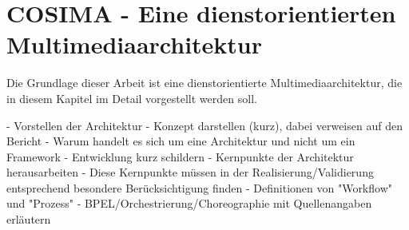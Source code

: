 
\chapter{COSIMA - Eine dienstorientierten Multimediaarchitektur} %
\label{cha:eine_dienstorientierten_multimediaarchitektur}

  Die Grundlage dieser Arbeit ist eine dienstorientierte Multimediaarchitektur, die in diesem Kapitel im Detail vorgestellt werden soll. 

- Vorstellen der Architektur
- Konzept darstellen (kurz), dabei verweisen auf den Bericht
- Warum handelt es sich um eine Architektur und nicht um ein Framework
- Entwicklung kurz schildern
- Kernpunkte der Architektur herausarbeiten
- Diese Kernpunkte müssen in der Realisierung/Validierung entsprechend besondere Berücksichtigung finden
- Definitionen von "Workflow" und "Prozess"
- BPEL/Orchestrierung/Choreographie mit Quellenangaben erläutern


